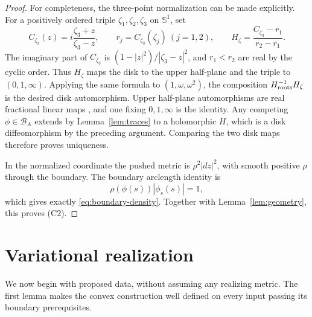 \documentclass[11pt]{article}
\theoremstyle{remark}
\newcommand{\Sone}{\mathbb S^1}
\newcommand{\BA}{\mathcal B_A}
\begin{document}
\begin{proof}
For completeness, the three-point normalization can be made explicitly.
For a positively ordered triple $\zeta_1,\zeta_2,\zeta_3$ on $\Sone$, set
\[
 C_{\zeta_3}(z)=i\frac{\zeta_3+z}{\zeta_3-z},\qquad
 r_j=C_{\zeta_3}(\zeta_j)\ (j=1,2),\qquad
 H_\zeta=\frac{C_{\zeta_3}-r_1}{r_2-r_1}.
\]
The imaginary part of $C_{\zeta_3}$ is
$(1-|z|^2)/|\zeta_3-z|^2$, and $r_1<r_2$ are real by the cyclic order.
Thus $H_\zeta$ maps the disk to the upper half-plane and the triple to
$(0,1,\infty)$. Applying the same formula to $(1,\omega,\omega^2)$,
the composition $H_{\rm roots}^{-1}H_\zeta$ is the desired disk
automorphism. Upper half-plane automorphisms are real fractional linear
maps \cite[Theorem~1.7]{Milnor}, and one fixing $0,1,\infty$ is the
identity. Any competing $\phi\in\BA$ extends by Lemma~\ref{lem:traces}
to a holomorphic $H$, which is a disk diffeomorphism by the preceding
argument. Comparing the two disk maps therefore proves uniqueness.

In the normalized coordinate the pushed metric is
$\rho^2|dz|^2$, with smooth positive $\rho$ through the boundary.
The boundary arclength identity is
\[
 \rho(\phi(s))|\phi_s(s)|=1,
\]
which gives exactly \eqref{eq:boundary-density}.
Together with Lemma~\ref{lem:geometry}, this proves (C2).
\end{proof}

\section{Variational realization}\label{sec:variation}
We now begin with proposed data, without assuming any realizing metric.
The first lemma makes the convex construction well defined on every
input passing its boundary prerequisites.
\end{document}
